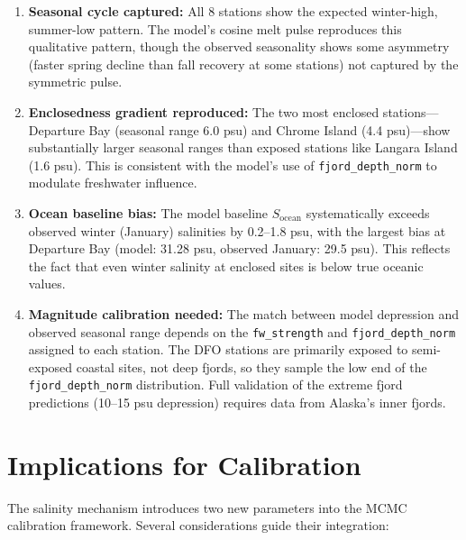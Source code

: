 \documentclass[11pt,a4paper]{article}
\begin{document}
\begin{enumerate}
    \item \textbf{Seasonal cycle captured:} All 8 stations show the expected winter-high, summer-low pattern. The model's cosine melt pulse reproduces this qualitative pattern, though the observed seasonality shows some asymmetry (faster spring decline than fall recovery at some stations) not captured by the symmetric pulse.

    \item \textbf{Enclosedness gradient reproduced:} The two most enclosed stations---Departure Bay (seasonal range 6.0 psu) and Chrome Island (4.4 psu)---show substantially larger seasonal ranges than exposed stations like Langara Island (1.6 psu). This is consistent with the model's use of \texttt{fjord\_depth\_norm} to modulate freshwater influence.

    \item \textbf{Ocean baseline bias:} The model baseline $S_{\text{ocean}}$ systematically exceeds observed winter (January) salinities by 0.2--1.8 psu, with the largest bias at Departure Bay (model: 31.28 psu, observed January: 29.5 psu). This reflects the fact that even winter salinity at enclosed sites is below true oceanic values.

    \item \textbf{Magnitude calibration needed:} The match between model depression and observed seasonal range depends on the \texttt{fw\_strength} and \texttt{fjord\_depth\_norm} assigned to each station. The DFO stations are primarily exposed to semi-exposed coastal sites, not deep fjords, so they sample the low end of the \texttt{fjord\_depth\_norm} distribution. Full validation of the extreme fjord predictions (10--15 psu depression) requires data from Alaska's inner fjords.
\end{enumerate}

\section{Implications for Calibration}
\label{sec:calibration}

The salinity mechanism introduces two new parameters into the MCMC calibration framework. Several considerations guide their integration:
\end{document}

